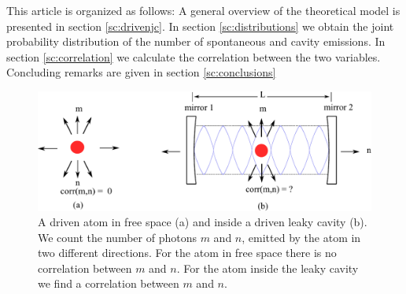 \documentclass[%
 reprint,
 amsmath,amssymb,
 aps, 
]{revtex4-1}
\begin{document}
This article is organized as follows: A general overview of the
theoretical model is presented in section \ref{sc:drivenjc}. In
section \ref{sc:distributions} we obtain the joint probability
distribution of the  number of spontaneous and cavity emissions. In
section \ref{sc:correlation} we calculate the correlation between the
two variables. Concluding remarks are given in section
\ref{sc:conclusions}
\begin{center}
\begin{figure}\label{asa}
\begin{center}
\includegraphics[scale = 0.65]{newimagepaper.pdf}
\caption{A driven atom in free space (a) and inside a driven leaky
  cavity (b). We count the number of photons $m$ and $n$, emitted by
  the atom in two different directions. For the atom in free space
  there is no correlation between $m$ and $n$. For the atom inside the
  leaky cavity we find a correlation between $m$ and $n$.}
\end{center}
\end{figure}
\end{center}
\end{document}
